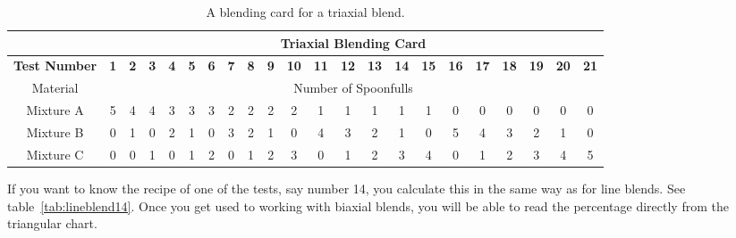 \begin{landscape}
\begin{center}
  \begin{table}\centering
  \renewcommand{\arraystretch}{1.5}
  \begin{tabular}{|c||c|c|c|c|c|c|c|c|c|c|c|c|c|c|c|c|c|c|c|c|c|}\hline
    &\multicolumn{21}{c}{\textbf{Triaxial Blending Card}}\vline\\\hline\hline
    \textbf{Test Number}
    &\textbf{1}&\textbf{2}&\textbf{3}&\textbf{4}&\textbf{5}&\textbf{6}
    &\textbf{7}&\textbf{8}&\textbf{9}&\textbf{10}&\textbf{11}&\textbf{12}&\textbf{13}
    &\textbf{14}&\textbf{15}&\textbf{16}&\textbf{17}&\textbf{18}&\textbf{19}
    &\textbf{20}&\textbf{21}\\\hline\hline
    Material&\multicolumn{21}{c}{Number of Spoonfulls}\vline\\\hline\hline
    Mixture A&5&4&4&3&3&3&2&2&2&2&1&1&1&1&1&0&0&0&0&0&0\\\hline
    Mixture B&0&1&0&2&1&0&3&2&1&0&4&3&2&1&0&5&4&3&2&1&0\\\hline
    Mixture C&0&0&1&0&1&2&0&1&2&3&0&1&2&3&4&0&1&2&3&4&5\\\hline
  \end{tabular}
  \caption{A blending card for a triaxial blend.}
  \label{tab:mixingcard}
\end{table}
  \end{center}
\end{landscape}
If you want to know the recipe of one of the tests, say number 14, you 
calculate this in the same way as for line blends. See 
table~\ref{tab:lineblend14}. Once you get used to working with biaxial blends, 
you will be able to read the percentage directly from the triangular chart.

